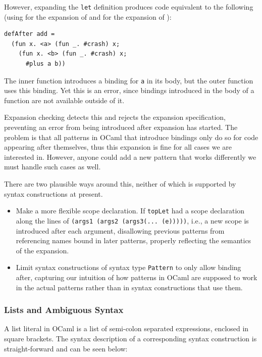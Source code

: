 \documentclass{kththesis}
\begin{document}
However, expanding the \texttt{let} definition produces code equivalent to the following (using  for the expansion of  and  for the expansion of ):

\begin{verbatim}
defAfter add =
  (fun x. <a> (fun _. #crash) x;
    (fun x. <b> (fun _. #crash) x;
      #plus a b))
\end{verbatim}

The inner function introduces a binding for \texttt{a} in its body, but the outer function uses this binding. Yet this is an error, since bindings introduced in the body of a function are not available outside of it.

Expansion checking detects this and rejects the expansion specification, preventing an error from being introduced after expansion has started. The problem is that all patterns in OCaml that introduce bindings only do so for code appearing after themselves, thus this expansion is fine for all cases we are interested in. However, anyone could add a new pattern that works differently we must handle such cases as well.

There are two plausible ways around this, neither of which is supported by syntax constructions at present.
\begin{itemize}
  \item Make a more flexible scope declaration. If \texttt{topLet} had a scope declaration along the lines of \texttt{(args1 (args2 (args3(... (e)))))}, i.e., a new scope is introduced after each argument, disallowing previous patterns from referencing names bound in later patterns, properly reflecting the semantics of the expansion.

  \item Limit syntax constructions of syntax type \texttt{Pattern} to only allow binding after, capturing our intuition of how patterns in OCaml are supposed to work in the actual patterns rather than in syntax constructions that use them.
\end{itemize}

\subsubsection{Lists and Ambiguous Syntax} \label{sec:ambiguous-lists}

A list literal in OCaml is a list of semi-colon separated expressions, enclosed in square brackets. The syntax description of a corresponding syntax construction is straight-forward and can be seen below:
\end{document}
